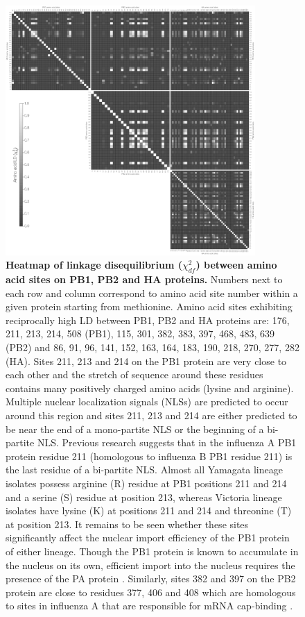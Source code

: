 \documentclass[11pt,oneside,letterpaper]{article}
\newcommand{\chiSq}{\chi^{2}_{df}}
\begin{document}
\begin{figure}
\centering  
\includegraphics[width=0.85\textwidth]  {supp_figures/aaChi_PB1_PB2_HA.png}
\caption{\textbf{Heatmap of linkage disequilibrium ($\chiSq$) between amino acid sites on PB1, PB2 and HA proteins.}
Numbers next to each row and column correspond to amino acid site number within a given protein starting from methionine.
Amino acid sites exhibiting reciprocally high LD between PB1, PB2 and HA proteins are: 176, 211, 213, 214, 508 (PB1), 115, 301, 382, 383, 397, 468, 483, 639 (PB2) and 86, 91, 96, 141, 152, 163, 164, 183, 190, 218, 270, 277, 282 (HA).
Sites 211, 213 and 214 on the PB1 protein are very close to each other and the stretch of sequence around these residues contains many positively charged amino acids (lysine and arginine).
Multiple nuclear localization signals (NLSs) are predicted to occur around this region and sites 211, 213 and 214 are either predicted to be near the end of a mono-partite NLS or the beginning of a bi-partite NLS.
Previous research \cite{nath1990} suggests that in the influenza A PB1 protein residue 211 (homologous to influenza B PB1 residue 211) is the last residue of a bi-partite NLS.
Almost all Yamagata lineage isolates possess arginine (R) residue at PB1 positions 211 and 214 and a serine (S) residue at position 213, whereas Victoria lineage isolates have lysine (K) at positions 211 and 214 and threonine (T) at position 213.
It remains to be seen whether these sites significantly affect the nuclear import efficiency of the PB1 protein of either lineage.
Though the PB1 protein is known to accumulate in the nucleus on its own, efficient import into the nucleus requires the presence of the PA protein \cite{fodor2004}.
Similarly, sites 382 and 397 on the PB2 protein are close to residues 377, 406 and 408 which are homologous to sites in influenza A that are responsible for mRNA cap-binding \cite{guilligay2008}.}
\label{ChiCore}
\end{figure}
\end{document}

